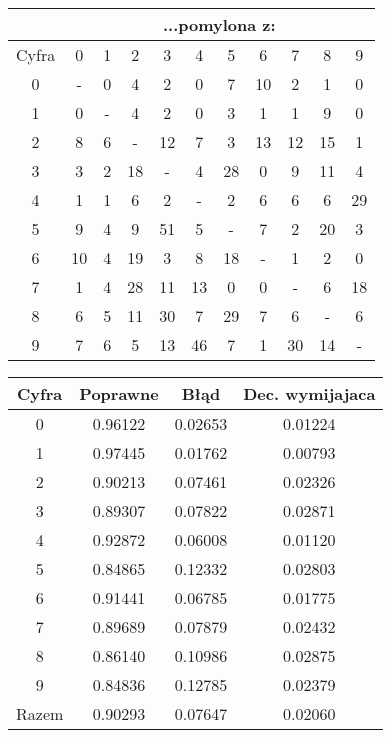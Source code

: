 \documentclass[12pt,a4paper,notitlepage]{article}
\begin{document}
\begin{center}
\begin{tabular}{|c|c|c|c|c|c|c|c|c|c|c|}
\hline
	& \multicolumn{10}{|c|}{...pomylona z:}\\\hline
 Cyfra &  0  &  1 &   2 &   3 &   4 &   5  &  6 &   7  &  8  &  9\\\hline
    0  &  -  &  0 &   4 &   2 &   0 &   7  & 10 &   2  &  1  &  0\\\hline
    1  &  0  &  - &   4 &   2 &   0 &   3  &  1 &   1  &  9  &  0\\\hline
    2  &  8  &  6 &   - &  12 &   7 &   3  & 13 &  12  & 15  &  1\\\hline
    3  &  3  &  2 &  18 &   - &   4 &  28  &  0 &   9  & 11  &  4\\\hline
    4  &  1  &  1 &   6 &   2 &   - &   2  &  6 &   6  &  6  & 29\\\hline
    5  &  9  &  4 &   9 &  51 &   5 &   -  &  7 &   2  & 20  &  3\\\hline
    6  & 10  &  4 &  19 &   3 &   8 &  18  &  - &   1  &  2  &  0\\\hline
    7  &  1  &  4 &  28 &  11 &  13 &   0  &  0 &   -  &  6  & 18\\\hline
    8  &  6  &  5 &  11 &  30 &   7 &  29  &  7 &   6  &  -  &  6\\\hline
    9  &  7  &  6 &   5 &  13 &  46 &   7  &  1 &  30  & 14  &  -\\\hline
\end{tabular}
\end{center}

\begin{center}
\begin{tabular}{|c|c|c|c|}
\hline
Cyfra & Poprawne & Błąd & Dec. wymijajaca\\\hline
   0 &  0.96122 &  0.02653 &  0.01224\\\hline
   1 &  0.97445 &  0.01762 &  0.00793\\\hline
   2 &  0.90213 &  0.07461 &  0.02326\\\hline
   3 &  0.89307 &  0.07822 &  0.02871\\\hline
   4 &  0.92872 &  0.06008 &  0.01120\\\hline
   5 &  0.84865 &  0.12332 &  0.02803\\\hline
   6 &  0.91441 &  0.06785 &  0.01775\\\hline
   7 &  0.89689 &  0.07879 &  0.02432\\\hline
   8 &  0.86140 &  0.10986 &  0.02875\\\hline
   9 &  0.84836 &  0.12785 &  0.02379\\\hline
   Razem &  0.90293 &  0.07647 &  0.02060\\\hline
\end{tabular}
\end{center}
\end{document}
